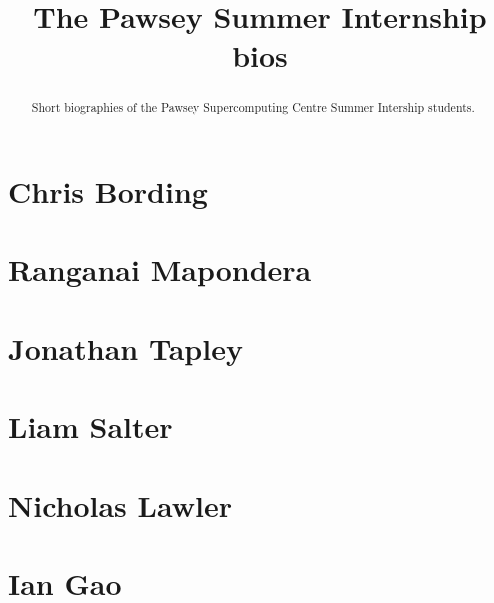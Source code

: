 \documentclass[11pt,a4paper]{report}
\title{The Pawsey Summer Internship bios}
\begin{document}
\maketitle
\tableofcontents


\begin{abstract}

Short biographies of the Pawsey Supercomputing Centre Summer Intership students.

\end{abstract}

\chapter{Chris Bording}


\chapter{Ranganai Mapondera}




\chapter{Jonathan Tapley}


\chapter{Liam Salter}


\chapter{Nicholas Lawler}


\chapter{Ian Gao}

\end{document}
